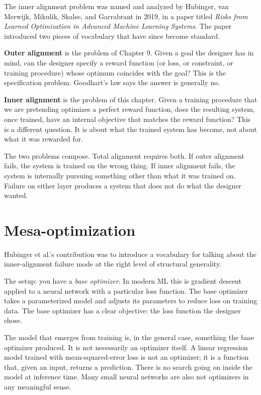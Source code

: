 The inner alignment problem was named and analyzed by Hubinger, van Merwijk, Mikulik, Skalse, and Garrabrant in 2019, in a paper titled \emph{Risks from Learned Optimization in Advanced Machine Learning Systems}. The paper introduced two pieces of vocabulary that have since become standard.

\textbf{Outer alignment} is the problem of Chapter 9. Given a goal the designer has in mind, can the designer specify a reward function (or loss, or constraint, or training procedure) whose optimum coincides with the goal? This is the specification problem. Goodhart's law says the answer is generally no.

\textbf{Inner alignment} is the problem of this chapter. Given a training procedure that we are pretending optimizes a perfect reward function, does the resulting system, once trained, have an internal objective that matches the reward function? This is a different question. It is about what the trained system has become, not about what it was rewarded for.

The two problems compose. Total alignment requires both. If outer alignment fails, the system is trained on the wrong thing. If inner alignment fails, the system is internally pursuing something other than what it was trained on. Failure on either layer produces a system that does not do what the designer wanted.

\section*{Mesa-optimization}

Hubinger et al.'s contribution was to introduce a vocabulary for talking about the inner-alignment failure mode at the right level of structural generality.

The setup: you have a \emph{base optimizer}. In modern ML this is gradient descent applied to a neural network with a particular loss function. The base optimizer takes a parameterized model and adjusts its parameters to reduce loss on training data. The base optimizer has a clear objective: the loss function the designer chose.

The model that emerges from training is, in the general case, something the base optimizer produced. It is not necessarily an optimizer itself. A linear regression model trained with mean-squared-error loss is not an optimizer; it is a function that, given an input, returns a prediction. There is no search going on inside the model at inference time. Many small neural networks are also not optimizers in any meaningful sense.

